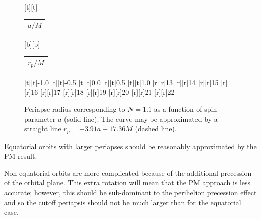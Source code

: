 \documentclass[aps,prd,amsfonts,amssymb,amsmath,nofootinbib,floatfix,reprint,showpacs,groupedaddress]{revtex4-1}
\begin{document}
\begin{figure}
\begin{psfrags}%
\psfragscanon%
%
[t][t]{\color[rgb]{0,0,0}\setlength{\tabcolsep}{0pt}\begin{tabular}{c}{\Large$a/M$}\end{tabular}}%
[b][b]{\color[rgb]{0,0,0}\setlength{\tabcolsep}{0pt}\begin{tabular}{c}{\Large$r_{p}/M$}\end{tabular}}%
%
[t][t]{-1.0}%
[t][t]{-0.5}%
[t][t]{0.0}%
[t][t]{0.5}%
[t][t]{1.0}%
%
[r][r]{13}%
[r][r]{14}%
[r][r]{15}%
[r][r]{16}%
[r][r]{17}%
[r][r]{18}%
[r][r]{19}%
[r][r]{20}%
[r][r]{21}%
[r][r]{22}%
%
%
\end{psfrags}%
\caption{Periapse radius corresponding to $N = 1.1$ as a function of spin parameter $a$ (solid line). The curve may be approximated by a straight line $r_{p} = -3.91 a + 17.36M$ (dashed line).\label{fig:N_peri}}
\end{figure}
Equatorial orbits with larger periapses should be reasonably approximated by the PM result.

Non-equatorial orbits are more complicated because of the additional precession of the orbital plane. This extra rotation will mean that the PM approach is less accurate; however, this should be sub-dominant to the perihelion precession effect and so the cutoff periapsis should not be much larger than for the equatorial case.
\end{document}
